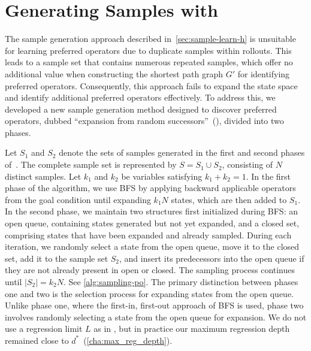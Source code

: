 \documentclass[ppgc,diss,english]{iiufrgs}
\begin{document}
\section{Generating Samples with \bfsrs}
\label{sec:sample-learn-po}
The sample generation approach described in~\cref{sec:sample-learn-h} is unsuitable for learning preferred operators due to duplicate samples within rollouts. This leads to a sample set that contains numerous repeated samples, which offer no additional value when constructing the shortest path graph $G'$ for identifying preferred operators. Consequently, this approach fails to expand the state space and identify additional preferred operators effectively. To address this, we developed a new sample generation method designed to discover preferred operators, dubbed ``expansion from random successors''~(\bfsrs), divided into two phases.

Let $S_1$ and $S_2$ denote the sets of samples generated in the first and second phases of~\bfsrs. The complete sample set is represented by $S = S_1 \cup S_2$, consisting of $N$ distinct samples. Let $k_1$ and $k_2$ be variables satisfying $k_1 + k_{2} = 1$.
In the first phase of the algorithm, we use BFS by applying backward applicable operators from the goal condition until expanding $k_1N$ states, which are then added to $S_1$.
In the second phase, we maintain two structures first initialized during BFS: an open queue, containing states generated but not yet expanded, and a closed set, comprising states that have been expanded and already sampled. During each iteration, we randomly select a state from the open queue, move it to the closed set, add it to the sample set $S_2$, and insert its predecessors into the open queue if they are not already present in open or closed. The sampling process continues until $|S_2| = k_2N$.
See \cref{alg:sampling-po}. The primary distinction between phases one and two is the selection process for expanding states from the open queue. Unlike phase one, where the first-in, first-out approach of BFS is used, phase two involves randomly selecting a state from the open queue for expansion. We do not use a regression limit $L$ as in \bfsrw, but in practice our maximum regression depth remained close to $d^{*}$~(\vref{cha:max_reg_depth}).
\end{document}
